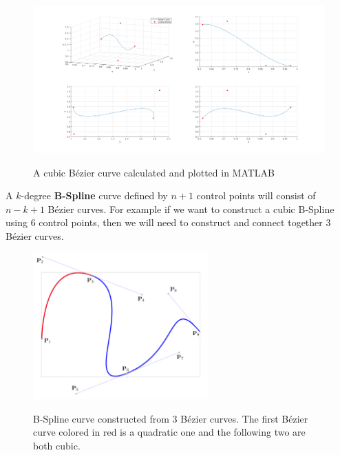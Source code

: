 \begin{center}
\begin{figure}[htbp]
\centering
\includegraphics[width=\textwidth]{images/bezier_path.png}\\
\caption{A cubic B\'ezier curve calculated and plotted in MATLAB} 
\end{figure}
\end{center}

A $k$-degree \textbf{B-Spline} curve defined by $n+1$ control points will consist of $n-k+1$ B\'ezier curves. For example if we want to construct a cubic B-Spline using 6 control points, then we will need to construct 
and connect together 3 B\'ezier curves.

\begin{center}
\begin{figure}[htbp]
\centering
\includegraphics[width=0.6\textwidth]{images/b-spline-explanation.png}\\
\caption{B-Spline curve constructed from 3 B\'ezier curves. The first B\'ezier curve colored in red is a quadratic one and the following two are both cubic.} 
\label{b-spline-explanation}
\end{figure}
\end{center}

